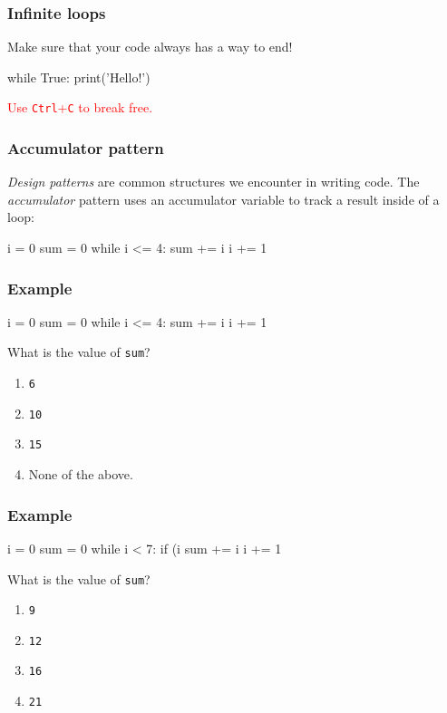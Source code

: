 \documentclass[11pt]{beamer}
\begin{document}
\begin{frame}[fragile]
  \frametitle{Infinite loops}
  \Enlarge

  \begin{itemize}
  \myitem  Make sure that your code always has a way to end!
  \begin{semiverbatim}
while True:
    print('Hello!')
  \end{semiverbatim}
  \myitem  \textcolor{red}{Use \texttt{Ctrl}+\texttt{C} to break free.}
  \end{itemize}
\end{frame}

\begin{frame}[fragile]
  \frametitle{Accumulator pattern}
  \Enlarge

  \begin{itemize}
  \myitem  \emph{Design patterns} are common structures we encounter in writing code. \pause
  \myitem  The \emph{accumulator} pattern uses an accumulator variable to track a result inside of a loop: \pause
  \begin{semiverbatim}
i = 0
sum = 0
while i <= 4:
    sum += i
    i += 1
  \end{semiverbatim}
  \end{itemize}
\end{frame}

\begin{frame}[fragile]
  \frametitle{Example}
  \Enlarge

  \begin{semiverbatim}
i = 0
sum = 0
while i <= 4:
    sum += i
    i += 1
  \end{semiverbatim}
  What is the value of \texttt{sum}?
  \begin{enumerate}[label=\Alph*]
  \item  \texttt{6}
  \item  \texttt{10}
  \item  \texttt{15}
  \item  None of the above.
  \end{enumerate}
\end{frame}

\begin{frame}[fragile]
  \frametitle{Example}
  \Enlarge

  \begin{semiverbatim}
i = 0
sum = 0
while i < 7:
    if (i %
        sum += i
        i += 1
  \end{semiverbatim}
  What is the value of \texttt{sum}?
  \begin{enumerate}[label=\Alph*]
  \item  \texttt{9}
  \item  \texttt{12}
  \item  \texttt{16}
  \item  \texttt{21}
  \end{enumerate}
\end{frame}
\end{document}
